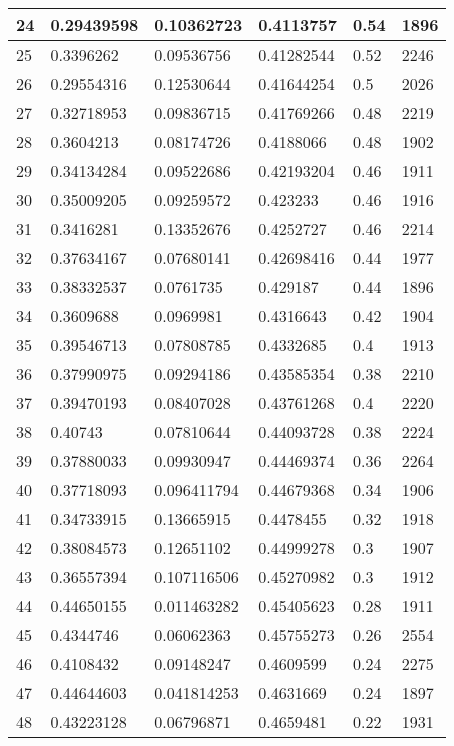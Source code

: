 \begin{longtable}{|l|l|l|l|l|l|}
24 & 0.29439598 & 0.10362723 & 0.4113757 & 0.54 & 1896 \\ \hline 
25 & 0.3396262 & 0.09536756 & 0.41282544 & 0.52 & 2246 \\ \hline 
26 & 0.29554316 & 0.12530644 & 0.41644254 & 0.5 & 2026 \\ \hline 
27 & 0.32718953 & 0.09836715 & 0.41769266 & 0.48 & 2219 \\ \hline 
28 & 0.3604213 & 0.08174726 & 0.4188066 & 0.48 & 1902 \\ \hline 
29 & 0.34134284 & 0.09522686 & 0.42193204 & 0.46 & 1911 \\ \hline 
30 & 0.35009205 & 0.09259572 & 0.423233 & 0.46 & 1916 \\ \hline 
31 & 0.3416281 & 0.13352676 & 0.4252727 & 0.46 & 2214 \\ \hline 
32 & 0.37634167 & 0.07680141 & 0.42698416 & 0.44 & 1977 \\ \hline 
33 & 0.38332537 & 0.0761735 & 0.429187 & 0.44 & 1896 \\ \hline 
34 & 0.3609688 & 0.0969981 & 0.4316643 & 0.42 & 1904 \\ \hline 
35 & 0.39546713 & 0.07808785 & 0.4332685 & 0.4 & 1913 \\ \hline 
36 & 0.37990975 & 0.09294186 & 0.43585354 & 0.38 & 2210 \\ \hline 
37 & 0.39470193 & 0.08407028 & 0.43761268 & 0.4 & 2220 \\ \hline 
38 & 0.40743 & 0.07810644 & 0.44093728 & 0.38 & 2224 \\ \hline 
39 & 0.37880033 & 0.09930947 & 0.44469374 & 0.36 & 2264 \\ \hline 
40 & 0.37718093 & 0.096411794 & 0.44679368 & 0.34 & 1906 \\ \hline 
41 & 0.34733915 & 0.13665915 & 0.4478455 & 0.32 & 1918 \\ \hline 
42 & 0.38084573 & 0.12651102 & 0.44999278 & 0.3 & 1907 \\ \hline 
43 & 0.36557394 & 0.107116506 & 0.45270982 & 0.3 & 1912 \\ \hline 
44 & 0.44650155 & 0.011463282 & 0.45405623 & 0.28 & 1911 \\ \hline 
45 & 0.4344746 & 0.06062363 & 0.45755273 & 0.26 & 2554 \\ \hline 
46 & 0.4108432 & 0.09148247 & 0.4609599 & 0.24 & 2275 \\ \hline 
47 & 0.44644603 & 0.041814253 & 0.4631669 & 0.24 & 1897 \\ \hline 
48 & 0.43223128 & 0.06796871 & 0.4659481 & 0.22 & 1931 \\ \hline 

\end{longtable}
